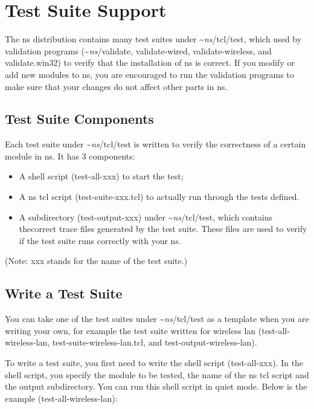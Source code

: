 \chapter{Test Suite Support}
\label{chap:testsuite}

The ns distribution contains many test suites under \textasciitilde\emph{ns}/{tcl/test}, which
used by validation programs (\textasciitilde\emph{ns}/{validate, validate-wired, validate-wireless, 
and validate.win32}) to verify that the installation of ns is correct. If you 
modify or add new modules to ns, you are encouraged to run the validation 
programs to make sure that your changes do not affect other parts in ns. 

\section{Test Suite Components}
\label{sec:testsuitecomponents}

Each test suite under \textasciitilde\emph{ns}/{tcl/test} is written to verify the correctness
of a certain module in ns. It has 3 components: 

\begin{itemize}
\item A shell script (test-all-xxx) to start the test;
\item A ns tcl script (test-suite-xxx.tcl) to actually run through the tests 
   defined.
\item A subdirectory (test-output-xxx) under \textasciitilde\emph{ns}/{tcl/test}, which contains 
 thecorrect trace files generated by the test suite. These files are used to 
 verify if the test suite runs correctly with your ns.
\end{itemize}

(Note: xxx stands for the name of the test suite.)

\section{Write a Test Suite}
\label{sec:writeatestsuite}

You can take one of the test suites under \textasciitilde\emph{ns}/{tcl/test} as a template when
you are writing your own, for example the test suite written for wireless lan
(test-all-wireless-lan, test-suite-wireless-lan.tcl, and 
test-output-wireless-lan). 

To write a test suite, you first need to write the shell script (test-all-xxx).
In the shell script, you specify the module to be tested, the name of the ns 
tcl script and the output subdirectory. You can run this shell script in quiet 
mode. Below is the example (test-all-wireless-lan):

